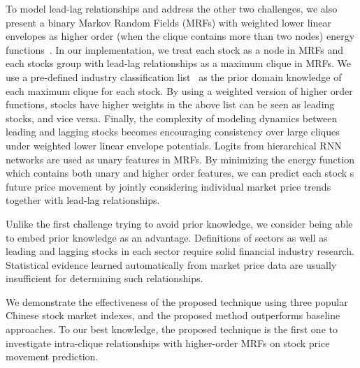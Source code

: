 To model lead-lag relationships and address the other two
challenges, we also present a binary Markov Random Fields (MRFs)
with weighted lower linear envelopes as higher order (when the
clique contains more than two nodes) energy
functions~\cite{Kohli:CVPR07,Nowozin:2011,Gould:ICML2011,gouldlearning}.
In our implementation, we treat each stock as a node in MRFs and
each stock\textquotesingle s group with lead-lag relationships as
a maximum clique in MRFs. We use a pre-defined industry
classification list~\cite{ths} as the prior domain knowledge of
each maximum clique for each stock. By using a weighted version
of higher order functions, stocks have higher weights in the
above list can be seen as leading stocks, and vice versa.
Finally, the complexity of modeling dynamics between leading and
lagging stocks becomes encouraging consistency over large cliques
under weighted lower linear envelope potentials. Logits from
hierarchical RNN networks are used as unary features in MRFs. By
minimizing the energy function which contains both unary and
higher order features, we can predict each stock\textquotesingle
s future price movement by jointly considering individual market
price trends together with lead-lag relationships.

Unlike the first challenge trying to avoid prior knowledge, we
consider being able to embed prior knowledge as an advantage.
Definitions of sectors as well as leading and lagging stocks in
each sector require solid financial industry research.
Statistical evidence learned automatically from market price data
are usually insufficient for determining such relationships.

We demonstrate the effectiveness of the proposed technique using
three popular Chinese stock market indexes, and the proposed
method outperforms baseline approaches. To our best knowledge,
the proposed technique is the first one to investigate
intra-clique relationships with higher-order MRFs on stock price
movement prediction.
  

